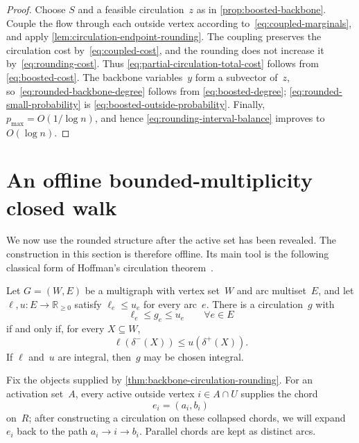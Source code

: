 \documentclass[12pt,a4paper,oneside]{report}
\begin{document}
\begin{proof}
Choose $S$ and a feasible circulation~$z$ as in
\cref{prop:boosted-backbone}.  Couple the flow through each outside
vertex according to~\cref{eq:coupled-marginals}, and apply
\cref{lem:circulation-endpoint-rounding}.  The coupling preserves the
circulation cost by~\cref{eq:coupled-cost}, and the rounding does not
increase it by~\cref{eq:rounding-cost}.  Thus
\cref{eq:partial-circulation-total-cost} follows from
\cref{eq:boosted-cost}.  The backbone variables~$y$ form a subvector of~$z$,
so~\cref{eq:rounded-backbone-degree} follows from
\cref{eq:boosted-degree}; \cref{eq:rounded-small-probability} is
\cref{eq:boosted-outside-probability}.  Finally,
$p_{\max}=O(1/\log n)$, and hence
\cref{eq:rounding-interval-balance} improves to
$O(\log n)$.
\end{proof}

\section{An offline bounded-multiplicity closed walk}
\label{sec:offline-backbone-walk}

We now use the rounded structure after the active set has been revealed.
The construction in this section is therefore offline.  Its main tool is the
following classical form of Hoffman's circulation theorem~\cite{Hoffman1960}.

\begin{theorem}\label{thm:hoffman-circulation}
Let $G=(W,E)$ be a multigraph with vertex set~$W$ and arc multiset~$E$, and let
$\ell,u:E\to\mathbb R_{\ge0}$ satisfy $\ell_e\le u_e$ for every arc~$e$.
There is a circulation~$g$ with
\[
    \ell_e\le g_e\le u_e
    \qquad\forall e\in E
\]
if and only if, for every $X\subseteq W$,
\begin{equation}\label{eq:hoffman-condition}
    \ell(\delta^-(X))\le u(\delta^+(X)).
\end{equation}
If $\ell$ and~$u$ are integral, then~$g$ may be chosen integral.
\end{theorem}

Fix the objects supplied by
\cref{thm:backbone-circulation-rounding}.  For an activation
set~$A$, every active outside vertex $i\in A\cap U$ supplies the chord
\[
    e_i=(a_i,b_i)
\]
on~$R$; after constructing a circulation on these collapsed chords, we will
expand $e_i$ back to the path $a_i\to i\to b_i$.  Parallel chords are kept as
distinct arcs.
\end{document}
